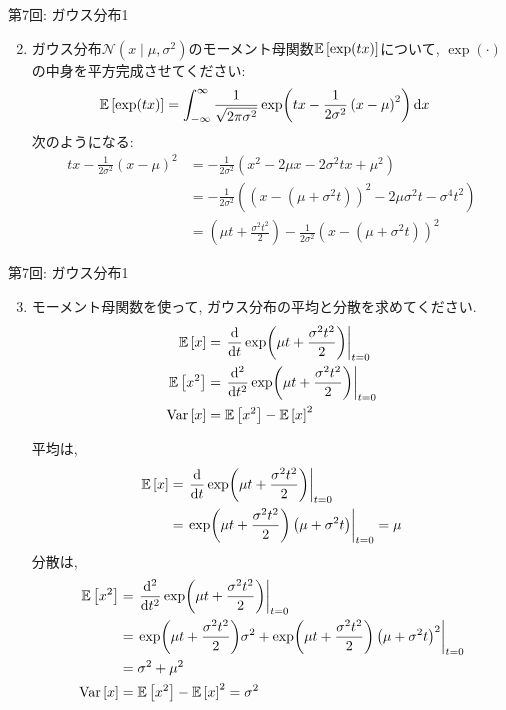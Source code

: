 \documentclass[dvipdfmx,notheorems,t]{beamer}
\begin{document}
\begin{frame}{第7回: ガウス分布1}
\begin{enumerate}
  \setcounter{enumi}{1}
  \item ガウス分布$\mathcal{N}(x \mid \mu, \sigma^2)$のモーメント母関数$\operatorname{\mathbb{E}} \left[ \exp(tx) \right]$について,
  $\exp(\cdot)$の中身を平方完成させてください:
  \begin{align*}
    \operatorname{\mathbb{E}} \left[ \exp(tx) \right] &= \int_{-\infty}^\infty \frac{1}{\sqrt{2\pi \sigma^2}}
      \exp(tx -\frac{1}{2 \sigma^2} \left( x - \mu \right)^2) \dd{x}
  \end{align*}
  次のようになる:
  \begin{align*}
    tx - \frac{1}{2 \sigma^2} \left( x - \mu \right)^2
    &= -\frac{1}{2 \sigma^2} \left( x^2 - 2 \mu x - 2 \sigma^2 tx + \mu^2 \right) \\
    &= -\frac{1}{2 \sigma^2} \left( \left( x - \left( \mu + \sigma^2 t \right) \right)^2
      - 2 \mu \sigma^2 t - \sigma^4 t^2 \right) \\
    &= \left( \mu t + \frac{\sigma^2 t^2}{2} \right)
      -\frac{1}{2 \sigma^2} \left( x - \left( \mu + \sigma^2 t \right) \right)^2
  \end{align*}
\end{enumerate}
\end{frame}

\begin{frame}{第7回: ガウス分布1}
\begin{enumerate}
  \setcounter{enumi}{2}
  \item モーメント母関数を使って, ガウス分布の平均と分散を求めてください.
  \begin{align*}
    \operatorname{\mathbb{E}} \left[ x \right] &= \left. \dv{t} \exp(\mu t + \frac{\sigma^2 t^2}{2}) \right|_{t = 0} \\
    \operatorname{\mathbb{E}} \left[ x^2 \right] &= \left. \dv[2]{t} \exp(\mu t + \frac{\sigma^2 t^2}{2}) \right|_{t = 0} \\
    \operatorname{Var} \left[ x \right] &= \operatorname{\mathbb{E}} \left[ x^2 \right] - \operatorname{\mathbb{E}} \left[ x \right]^2
  \end{align*}

  \newpage
  平均は,
  \begin{align*}
    \operatorname{\mathbb{E}} \left[ x \right] &= \left. \dv{t} \exp(\mu t + \frac{\sigma^2 t^2}{2}) \right|_{t = 0} \\
      &= \left. \exp(\mu t + \frac{\sigma^2 t^2}{2}) \left( \mu + \sigma^2 t \right) \right|_{t = 0}
      = \mu
  \end{align*}
  分散は,
  \begin{align*}
    \operatorname{\mathbb{E}} \left[ x^2 \right] &= \left. \dv[2]{t} \exp(\mu t + \frac{\sigma^2 t^2}{2}) \right|_{t = 0} \\
      &= \left. \exp(\mu t + \frac{\sigma^2 t^2}{2}) \sigma^2 +
        \exp(\mu t + \frac{\sigma^2 t^2}{2}) \left( \mu + \sigma^2 t \right)^2 \right|_{t = 0} \\
      &= \sigma^2 + \mu^2 \\
    \operatorname{Var} \left[ x \right] &= \operatorname{\mathbb{E}} \left[ x^2 \right] - \operatorname{\mathbb{E}} \left[ x \right]^2 = \sigma^2
  \end{align*}
\end{enumerate}
\end{frame}
\end{document}
